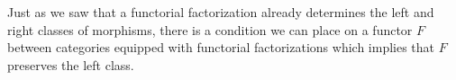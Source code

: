 

Just as we saw that a functorial factorization already determines the left and right classes of morphisms, there is a condition we can place on a functor $F$ between categories equipped with functorial factorizations which implies that $F$ preserves the left class.

